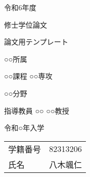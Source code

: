 \documentclass[main]{subfiles}
\begin{document}
\begin{titlepage}
    \fontsize{30pt}{30pt} \selectfont
    
    \centering
    令和6年度
    \vspace{15pt}
    
    修士学位論文
    \vspace{45pt}
    
    論文用テンプレート
    \vspace{45pt}
    
    ○○所属
    \vspace{20pt}
    
    ○○課程 ○○専攻
    \vspace{20pt}
    
    ○○分野
    \vspace{45pt}
    
    指導教員 ○○ ○○教授
    \vspace{45pt}
    
    令和○年入学
    \vspace{15pt}
    
    \begin{tabular}{ll}
        学籍番号 & 82313206 \\
        氏名   & 八木颯仁     \\
    \end{tabular}
    \normalsize
    
\end{titlepage}
\end{document}
